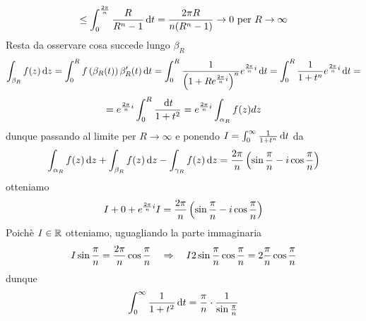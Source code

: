 \begin{ese}
\begin{equation}
\begin{split}
\leq  \int_0^{\frac{2\pi}{n}} \frac{R}{R^n-1} \, \mathrm{d}t =\frac{2\pi R}{n(R^n-1)} \to 0 \text{ per } R\to \infty
\end{split}
\end{equation}
Resta da osservare cosa succede lungo $\beta_R$
$$ \int_{\beta_R} f(z) \, \mathrm{d}z = \int_0^R f\left( \beta_R(t) \right) \beta'_R(t) \, \mathrm{d}t = \int_0^R \frac{1}{\left(  1 + Re^{\frac{2\pi}{n}i} \right)^n} e^{\frac{2\pi }{n}i} \, \mathrm{d}t  =\int_0^R \frac{1}{1+t^n} e^{\frac{2\pi }{n}i}\, \mathrm{d}t  =$$
$$=e^{\frac{2\pi}{n}i} \int_0^R \frac{\, \mathrm{d}t }{1+t^2}=e^{\frac{2\pi}{n}i} \int_{\alpha_R} f(z) dz $$ 
dunque passando al limite per $R \to \infty$ e ponendo $I= \int_0^\infty \frac{1}{1+t^n}\, \mathrm{d}t $ da 
$$ \int_{\alpha_R} f(z) \, \mathrm{d}z + \int_{\beta_R} f(z) \, \mathrm{d}z -\int_{\gamma_R} f(z) \, \mathrm{d}z = \frac{2\pi}{n}\left( \sin \frac{\pi}{n}-i\cos\frac{\pi}{n} \right)$$
otteniamo 
$$ I + 0 + e^{\frac{2\pi}{n} i } I =  \frac{2\pi}{n}\left( \sin \frac{\pi}{n}-i\cos\frac{\pi}{n} \right)$$
Poich\`e $I\in \mathbb{R}$ otteniamo, uguagliando la parte immaginaria 
$$ I \sin \frac{\pi}{n} = \frac{2\pi}{n}\cos\frac{\pi}{n} \quad \Rightarrow \quad I 2\sin \frac{\pi}{n}\cos \frac{\pi}{n} =2\frac{\pi}{n}\cos \frac{\pi}{n}$$ 
dunque 
$$ \int_0^\infty \frac{1}{1+t^2}\, \mathrm{d}t =\frac{\pi}{n}\cdot\frac{1}{\sin\frac{\pi}{n}}$$
\end{ese}
\spazio

